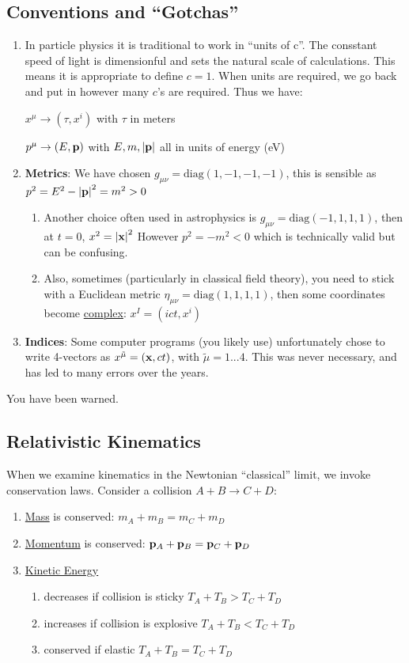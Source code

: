 \subsection{Conventions and ``Gotchas''}
\begin{enumerate}
\item In particle physics it is traditional to work in ``units of c''. The consstant speed of light is dimensionful and sets the natural scale of calculations. This means it is appropriate to define $\boxed{c=1}$. When units are required, we go back and put in however many $c$'s are required. Thus we have:

  $x^\mu\to(\tau,x^i)$ with $\tau$ in meters

  $p^\mu\to(E,\vb{p})$ with $E,m,\abs{\vb{p}}$ all in units of energy (eV)
\item \textbf{Metrics}: We have chosen $g_{\mu\nu}=\mathrm{diag}(1,-1,-1,-1)$, this is sensible as $p^2=E^2-\abs{\vb{p}}^2=m^2>0$
  \begin{enumerate}[label=\alph*)]
  \item Another choice often used in astrophysics is $g_{\mu\nu}=\mathrm{diag}(-1,1,1,1)$, then at $t=0$, $x^2=\abs{\vb{x}}^2$ However $p^2=-m^2<0$ which is technically valid but can be confusing.
  \item Also, sometimes (particularly in classical field theory), you need to stick with a Euclidean metric $\eta_{\mu\nu}=\mathrm{diag}(1,1,1,1)$, then some coordinates become \underline{complex}: $x^I=(ict,x^i)$
  \end{enumerate}
\item \textbf{Indices}: Some computer programs (you likely use) unfortunately chose to write 4-vectors as $x^{\tilde{\mu}}=(\vb{x},ct)$, with $\tilde{\mu}=1...4$. This was never necessary, and has led to many errors over the years.
\end{enumerate}
You have been warned.

\subsection{Relativistic Kinematics}
When we examine kinematics in the Newtonian ``classical'' limit, we invoke conservation laws. Consider a collision $A+B\to C+D$:
\begin{enumerate}
\item \underline{Mass} is conserved: $m_A+m_B=m_C+m_D$
\item \underline{Momentum} is conserved: $\vb{p}_A+\vb{p}_B=\vb{p}_C+\vb{p}_D$
\item \underline{Kinetic Energy}
  \begin{enumerate}[label=\alpha*)]
  \item decreases if collision is sticky $T_A+T_B>T_C+T_D$
  \item increases if collision is explosive $T_A+T_B<T_C+T_D$
  \item conserved if elastic $T_A+T_B=T_C+T_D$
  \end{enumerate}
\end{enumerate}

